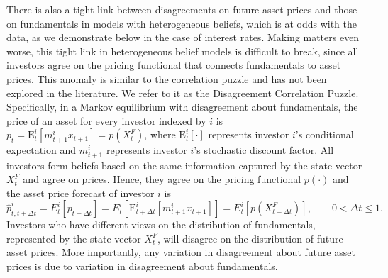 \documentclass[preprint,11pt,authoryear]{elsarticle}
\theoremstyle{plain}
\begin{document}
There is also a tight link between disagreements on future asset prices and those on fundamentals in models with heterogeneous beliefs, which is at odds with the data, as we demonstrate below in the case of interest rates. Making matters even worse, this tight link in heterogeneous belief models is difficult to break, since all investors agree on the pricing functional that connects fundamentals to asset prices. This anomaly is similar to the correlation puzzle and has not been explored in the literature. We refer to it as the Disagreement Correlation Puzzle. Specifically, in a Markov equilibrium with disagreement about fundamentals, the price of an asset for every investor indexed by $i$ is $p_t = \mathrm{E}^i_{t} \left[ m^i_{t+1} x_{t+1} \right] = p \left(X_t^F \right)$,
where $\mathrm{E}^i_{t} \left[ \cdot \right]$ represents investor $i$'s conditional expectation and $m^i_{t+1}$ represents investor $i$'s stochastic discount factor. All investors form beliefs based on the same information captured by the state vector $X_t^F$ and agree on prices. Hence, they agree on the pricing functional $p(\cdot)$ and the asset price forecast of investor $i$ is  
\begin{equation} \label{eq:apforecast}
	\hat{p}^i_{t,t+\Delta t} = E^i_{t} \left[  p_{t+\Delta t}  \right] =  E^i_{t} \left[ \mathrm{E}^i_{t+\Delta t}  \left[ m^i_{t+1} x_{t+1} \right]  \right] = E^i_{t} \left[ p \left( X^F_{t+\Delta t} \right) \right],\qquad 0  < \Delta t \leq 1.
\end{equation}
Investors who have different views on the distribution of fundamentals, represented by the state vector $X_t^F$, will disagree on the distribution of future asset prices. More importantly, any variation in disagreement about future asset prices is due to variation in disagreement about fundamentals. %
\end{document}

